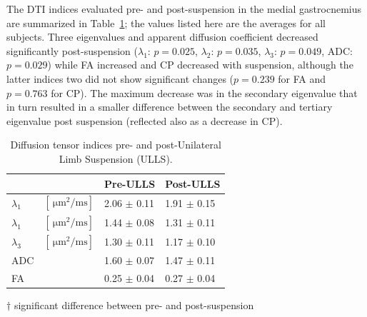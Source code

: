 The DTI indices evaluated pre- and post-suspension in the medial gastrocnemius are summarized in Table~\ref{tab: Karger1};
the values listed here are the averages for all subjects. Three eigenvalues and apparent diffusion coefficient  decreased significantly post-suspension ($\lambda_1$:  $p = 0.025$, $\lambda_2$: $p = 0.035$, $\lambda_3$: $p = 0.049$, ADC: $p = 0.029$) while FA increased and CP decreased with suspension, although the latter indices two did not show significant changes ($p = 0.239$ for FA and $p=0.763$ for CP). 
The maximum decrease was in the secondary eigenvalue that in turn resulted in a smaller difference between the secondary and tertiary eigenvalue post suspension (reflected also as a decrease in CP).
\begin{table}[!htb]
\vspace{+0.2cm}
\caption[Diffusion tensor indices pre- and post-suspension]{Diffusion tensor indices pre- and post-Unilateral Limb Suspension (ULLS).}
\label{tab: Karger1}
\begin{center}
\begin{threeparttable}
\begin{tabular}{@{}llll@{}}
\toprule[1pt]\midrule[0.3pt]
  &   & Pre-ULLS    & Post-ULLS   \\ \midrule
$\lambda_1$\tnote{$\dagger$} & $\left[\SI{}{\micro\meter^2 / \milli\second}\right]$ & 2.06 $\pm$ 0.11 & 1.91 $\pm$ 0.15 \\[6pt]
$\lambda_1$\tnote{$\dagger$} & $\left[\SI{}{\micro\meter^2 / \milli\second}\right]$ & 1.44 $\pm$ 0.08 & 1.31 $\pm$ 0.11 \\[6pt]
$\lambda_3$\tnote{$\dagger$}& $\left[\SI{}{\micro\meter^2 / \milli\second}\right]$ & 1.30 $\pm$ 0.11 & 1.17 $\pm$ 0.10 \\[6pt]
ADC\tnote{$\dagger$}   	&	& 1.60 $\pm$ 0.07 & 1.47 $\pm$ 0.11 \\[6pt]
FA   					&	& 0.25 $\pm$ 0.04 & 0.27 $\pm$ 0.04 \\ \midrule[0.3pt]\bottomrule[1pt]
\end{tabular}
\begin{tablenotes}[flushleft]\footnotesize
\item[$\dagger$] significant difference between pre- and post-suspension
\end{tablenotes}
\end{threeparttable}
\end{center}
\vspace{-0.2cm}
\end{table}
